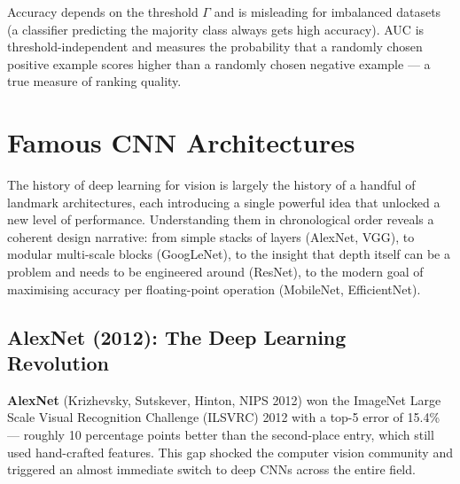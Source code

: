 \documentclass[11pt,a4paper]{article}
\newcommand{\term}[1]{\textcolor{DefGreen}{\textbf{#1}}\index{#1}}
\begin{document}
\begin{insightbox}
Accuracy depends on the threshold $\Gamma$ and is misleading for imbalanced datasets (a classifier predicting the majority class always gets high accuracy). AUC is threshold-independent and measures the probability that a randomly chosen positive example scores higher than a randomly chosen negative example — a true measure of ranking quality.
\end{insightbox}

\section{Famous CNN Architectures}
\label{sec:famous_archs}

The history of deep learning for vision is largely the history of a handful of landmark architectures, each introducing a single powerful idea that unlocked a new level of performance.  Understanding them in chronological order reveals a coherent design narrative: from simple stacks of layers (AlexNet, VGG), to modular multi-scale blocks (GoogLeNet), to the insight that depth itself can be a problem and needs to be engineered around (ResNet), to the modern goal of maximising accuracy per floating-point operation (MobileNet, EfficientNet).

\subsection{AlexNet (2012): The Deep Learning Revolution}
\label{sec:alexnet}

\term{AlexNet} (Krizhevsky, Sutskever, Hinton, NIPS 2012) won the ImageNet Large Scale Visual
Recognition Challenge (ILSVRC) 2012 with a top-5 error of 15.4\% — roughly 10 percentage points
better than the second-place entry, which still used hand-crafted features.  This gap shocked the
computer vision community and triggered an almost immediate switch to deep CNNs across the entire field.
\end{document}
